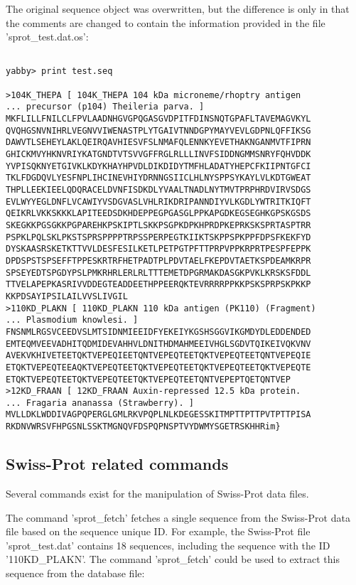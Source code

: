 The original sequence object was overwritten, but the difference
is only in that the comments are changed to contain the information
provided in the file 'sprot\_test.dat.os':

\begin{verbatim}

yabby> print test.seq

>104K_THEPA [ 104K_THEPA 104 kDa microneme/rhoptry antigen
... precursor (p104) Theileria parva. ]
MKFLILLFNILCLFPVLAADNHGVGPQGASGVDPITFDINSNQTGPAFLTAVEMAGVKYL
QVQHGSNVNIHRLVEGNVVIWENASTPLYTGAIVTNNDGPYMAYVEVLGDPNLQFFIKSG
DAWVTLSEHEYLAKLQEIRQAVHIESVFSLNMAFQLENNKYEVETHAKNGANMVTFIPRN
GHICKMVYHKNVRIYKATGNDTVTSVVGFFRGLRLLLINVFSIDDNGMMSNRYFQHVDDK
YVPISQKNYETGIVKLKDYKHAYHPVDLDIKDIDYTMFHLADATYHEPCFKIIPNTGFCI
TKLFDGDQVLYESFNPLIHCINEVHIYDRNNGSIICLHLNYSPPSYKAYLVLKDTGWEAT
THPLLEEKIEELQDQRACELDVNFISDKDLYVAALTNADLNYTMVTPRPHRDVIRVSDGS
EVLWYYEGLDNFLVCAWIYVSDGVASLVHLRIKDRIPANNDIYVLKGDLYWTRITKIQFT
QEIKRLVKKSKKKLAPITEEDSDKHDEPPEGPGASGLPPKAPGDKEGSEGHKGPSKGSDS
SKEGKKPGSGKKPGPAREHKPSKIPTLSKKPSGPKDPKHPRDPKEPRKSKSPRTASPTRR
PSPKLPQLSKLPKSTSPRSPPPPTRPSSPERPEGTKIIKTSKPPSPKPPFDPSFKEKFYD
DYSKAASRSKETKTTVVLDESFESILKETLPETPGTPFTTPRPVPPKRPRTPESPFEPPK
DPDSPSTSPSEFFTPPESKRTRFHETPADTPLPDVTAELFKEPDVTAETKSPDEAMKRPR
SPSEYEDTSPGDYPSLPMKRHRLERLRLTTTEMETDPGRMAKDASGKPVKLKRSKSFDDL
TTVELAPEPKASRIVVDDEGTEADDEETHPPEERQKTEVRRRRPPKKPSKSPRPSKPKKP
KKPDSAYIPSILAILVVSLIVGIL
>110KD_PLAKN [ 110KD_PLAKN 110 kDa antigen (PK110) (Fragment)
... Plasmodium knowlesi. ]
FNSNMLRGSVCEEDVSLMTSIDNMIEEIDFYEKEIYKGSHSGGVIKGMDYDLEDDENDED
EMTEQMVEEVADHITQDMIDEVAHHVLDNITHDMAHMEEIVHGLSGDVTQIKEIVQKVNV
AVEKVKHIVETEETQKTVEPEQIEETQNTVEPEQTEETQKTVEPEQTEETQNTVEPEQIE
ETQKTVEPEQTEEAQKTVEPEQTEETQKTVEPEQTEETQKTVEPEQTEETQKTVEPEQTE
ETQKTVEPEQTEETQKTVEPEQTEETQKTVEPEQTEETQNTVEPEPTQETQNTVEP
>12KD_FRAAN [ 12KD_FRAAN Auxin-repressed 12.5 kDa protein.
... Fragaria ananassa (Strawberry). ]
MVLLDKLWDDIVAGPQPERGLGMLRKVPQPLNLKDEGESSKITMPTTPTTPVTPTTPISA
RKDNVWRSVFHPGSNLSSKTMGNQVFDSPQPNSPTVYDWMYSGETRSKHHRim}

\end{verbatim}

\subsection{Swiss-Prot related commands}

Several commands exist for the manipulation of Swiss-Prot data
files.


The command 'sprot\_fetch' fetches a single sequence from the
Swiss-Prot data file based on the sequence unique ID. For example,
the Swiss-Prot file 'sprot\_test.dat' contains 18 sequences,
including the sequence with the ID '110KD\_PLAKN'. The command
'sprot\_fetch' could be used to extract this sequence from the
database file:

